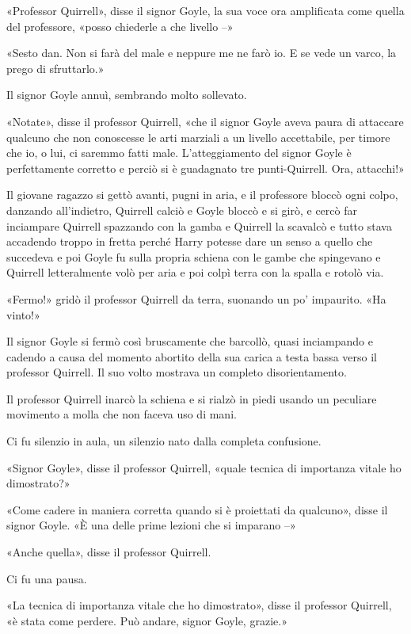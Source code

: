 «Professor Quirrell», disse il signor Goyle, la sua voce ora amplificata come quella del professore, «posso chiederle a che livello –»

«Sesto dan. Non si farà del male e neppure me ne farò io. E se vede un varco, la prego di sfruttarlo.»

Il signor Goyle annuì, sembrando molto sollevato.

«Notate», disse il professor Quirrell, «che il signor Goyle aveva paura di attaccare qualcuno che non conoscesse le arti marziali a un livello accettabile, per timore che io, o lui, ci saremmo fatti male. L’atteggiamento del signor Goyle è perfettamente corretto e perciò si è guadagnato tre punti-Quirrell. Ora, attacchi!»

Il giovane ragazzo si gettò avanti, pugni in aria, e il professore bloccò ogni colpo, danzando all’indietro, Quirrell calciò e Goyle bloccò e si girò, e cercò far inciampare Quirrell spazzando con la gamba e Quirrell la scavalcò e tutto stava accadendo troppo in fretta perché Harry potesse dare un senso a quello che succedeva e poi Goyle fu sulla propria schiena con le gambe che spingevano e Quirrell letteralmente volò per aria e poi colpì terra con la spalla e rotolò via.

«Fermo!» gridò il professor Quirrell da terra, suonando un po’ impaurito. «Ha vinto!»

Il signor Goyle si fermò così bruscamente che barcollò, quasi inciampando e cadendo a causa del momento abortito della sua carica a testa bassa verso il professor Quirrell. Il suo volto mostrava un completo disorientamento.

Il professor Quirrell inarcò la schiena e si rialzò in piedi usando un peculiare movimento a molla che non faceva uso di mani.

Ci fu silenzio in aula, un silenzio nato dalla completa confusione.

«Signor Goyle», disse il professor Quirrell, «quale tecnica di importanza vitale ho dimostrato?»

«Come cadere in maniera corretta quando si è proiettati da qualcuno», disse il signor Goyle. «È una delle prime lezioni che si imparano –»

«Anche quella», disse il professor Quirrell.

Ci fu una pausa.

«La tecnica di importanza vitale che ho dimostrato», disse il professor Quirrell, «è stata come perdere. Può andare, signor Goyle, grazie.»

